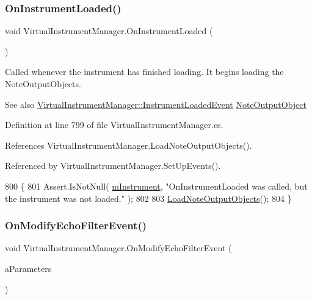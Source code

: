 \subsubsection{\texorpdfstring{On\+Instrument\+Loaded()}{OnInstrumentLoaded()}}
{\footnotesize\ttfamily void Virtual\+Instrument\+Manager.\+On\+Instrument\+Loaded (\begin{DoxyParamCaption}{ }\end{DoxyParamCaption})}



Called whenever the instrument has finished loading. It begins loading the Note\+Output\+Objects. 

\begin{DoxySeeAlso}{See also}
\hyperlink{group___v_i_m_event_types_class_virtual_instrument_manager_1_1_instrument_loaded_event}{Virtual\+Instrument\+Manager\+::\+Instrument\+Loaded\+Event} \hyperlink{class_note_output_object}{Note\+Output\+Object} 
\end{DoxySeeAlso}


Definition at line 799 of file Virtual\+Instrument\+Manager.\+cs.



References Virtual\+Instrument\+Manager.\+Load\+Note\+Output\+Objects().



Referenced by Virtual\+Instrument\+Manager.\+Set\+Up\+Events().


\begin{DoxyCode}
800     \{
801         Assert.IsNotNull( \hyperlink{group___v_i_m_priv_gaed435d1f9be09864846db4322dc21fd1}{mInstrument}, \textcolor{stringliteral}{"OnInstrumentLoaded was called, but the instrument was
       not loaded."} );
802 
803         \hyperlink{group___v_i_m_priv_func_ga8817e32cc5074737b4d9489922b0fcb8}{LoadNoteOutputObjects}();
804     \}
\end{DoxyCode}
\mbox{\label{group___v_i_m_handlers_gae504c6ded8eb68ffb117c207fc25d99d}} 
\subsubsection{\texorpdfstring{On\+Modify\+Echo\+Filter\+Event()}{OnModifyEchoFilterEvent()}}
{\footnotesize\ttfamily void Virtual\+Instrument\+Manager.\+On\+Modify\+Echo\+Filter\+Event (\begin{DoxyParamCaption}\item[{\hyperlink{group__filter_params_struct_virtual_instrument_manager_1_1_echo_filter_parameters}{Echo\+Filter\+Parameters}}]{a\+Parameters }\end{DoxyParamCaption})}



